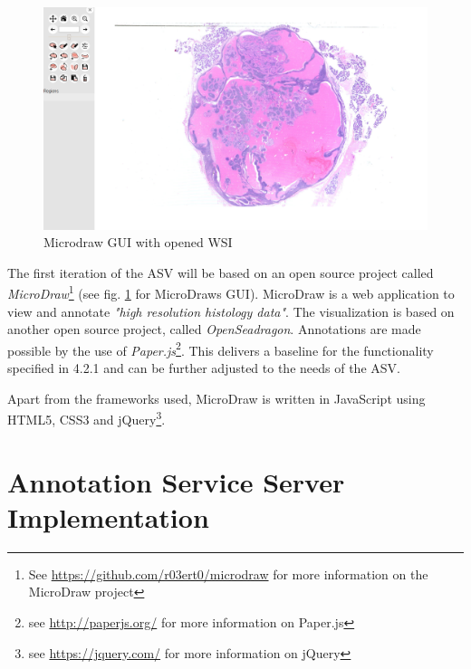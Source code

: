 \begin{figure}[H]
	\begin{center}
		\includegraphics[scale=0.2]{img/microdrawUI.png}
		\caption{Microdraw GUI with opened WSI}
		\label{fig4_microdrawUI}
	\end{center}
\end{figure}

The first iteration of the ASV will be based on an open source project called \emph{MicroDraw}\footnote{See \url{https://github.com/r03ert0/microdraw} for more information on the MicroDraw project} (see fig. \ref{fig4_microdrawUI} for MicroDraws GUI).  MicroDraw is a web application to view and annotate \emph{"high resolution histology data"}\cite{web:microdraw2}. The visualization is based on another open source project, called \emph{OpenSeadragon}\cite{web:openseadragon}. Annotations are made possible by the use of \emph{Paper.js}\footnote{see \url{http://paperjs.org/} for more information on Paper.js}. This delivers a baseline for the functionality specified in 4.2.1 and can be further adjusted to the needs of the ASV.

Apart from the frameworks used, MicroDraw is written in JavaScript using HTML5, CSS3 and jQuery\footnote{see \url{https://jquery.com/} for more information on jQuery}.

\section{Annotation Service Server Implementation}



